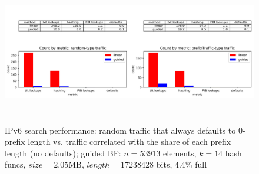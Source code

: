 \documentclass[conference,compsoc]{IEEEtran}
\begin{document}
\begin{figure}[h]
\centering
\includegraphics[height=2.5in]{../img/ipv6_traffic_comparison.png}
\caption{IPv6 search performance: random traffic that always defaults to 0-prefix length vs. traffic correlated with the share of each prefix length (no defaults);
  guided BF: $n=53913$ elements, $k=14$ hash funcs, $size=2.05$MB, $length=17238428$ bits, $4.4$\% full}
\label{fig:IPv6-by-traffic}
\end{figure}

\newpage


\end{document}
